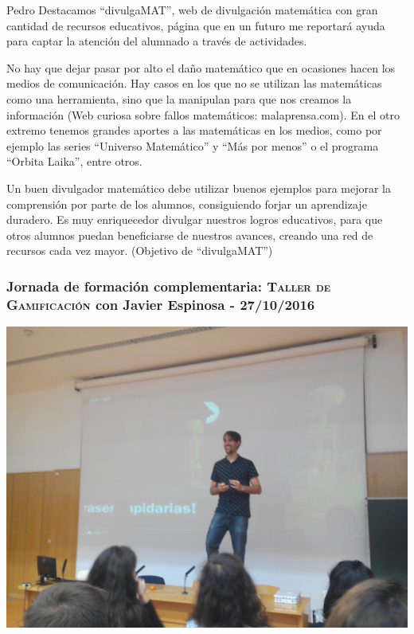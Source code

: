 \begin{opin}{\pedrocolor}{Pedro}
 Destacamos “divulgaMAT”, web de divulgación matemática con gran cantidad de recursos educativos, página que en un futuro me reportará ayuda para captar la atención del alumnado a través de actividades.

No hay que dejar pasar por alto el daño matemático que en ocasiones hacen los medios de comunicación. Hay casos en los que no se utilizan las matemáticas como una herramienta, sino que la manipulan para que nos creamos la información (Web curiosa sobre fallos matemáticos: malaprensa.com). En el otro extremo tenemos grandes aportes a las matemáticas en los medios, como por ejemplo las series “Universo Matemático” y “Más por menos” o el programa  “Orbita Laika”, entre otros.

Un buen divulgador matemático debe utilizar buenos ejemplos para mejorar la comprensión por parte de los alumnos, consiguiendo forjar un aprendizaje duradero. Es muy enriquecedor divulgar nuestros logros educativos, para que otros alumnos puedan beneficiarse de nuestros avances, creando una red de recursos cada vez mayor. (Objetivo de “divulgaMAT”)

\subsubsection{Jornada de formación complementaria: \textsc{Taller de Gamificación} con Javier Espinosa - 27/10/2016}

\begin{minipage}[hbtp]{1.0\linewidth}
\centering
\includegraphics[scale=0.1]{img/gamingpedro.jpg}
\end{minipage}


\end{opin}
